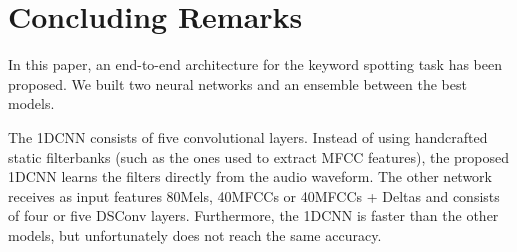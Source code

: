 \documentclass[conference]{IEEEtran}
\begin{document}
\begin{table}[]
\caption{Ensemble performances on 10 and 21-commands datasets.}
\end{table}

\section{Concluding Remarks}
In this paper, an end-to-end architecture for the keyword spotting task has been proposed. We built two neural networks and an ensemble between the best models.

The 1DCNN consists of five convolutional layers. Instead of using handcrafted static filterbanks (such as the ones used to extract MFCC features), the proposed 1DCNN learns the filters directly from the audio waveform. The other network receives as input features 80Mels, 40MFCCs or 40MFCCs + Deltas and consists of four or five DSConv layers. Furthermore, the 1DCNN is faster than the other models, but unfortunately does not reach the same accuracy.
\end{document}
